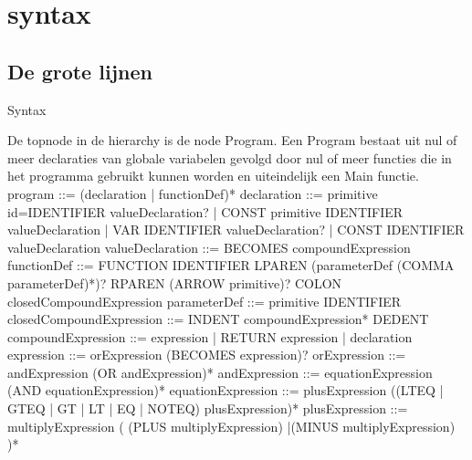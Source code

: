 \chapter{syntax}
\section{De grote lijnen}
Syntax

De topnode in de hierarchy is de node Program. Een Program bestaat uit nul of meer declaraties van globale variabelen gevolgd door nul of meer functies die in het programma gebruikt kunnen worden en uiteindelijk een Main functie.
\newline 
program                     ::= (declaration | functionDef)*
\newline 
declaration                 ::= primitive id=IDENTIFIER valueDeclaration?
                              | CONST primitive IDENTIFIER valueDeclaration
                              | VAR IDENTIFIER valueDeclaration?
                              | CONST IDENTIFIER valueDeclaration
\newline   
valueDeclaration            ::= BECOMES compoundExpression
\newline  
functionDef                 ::= FUNCTION IDENTIFIER LPAREN (parameterDef (COMMA parameterDef)*)? RPAREN (ARROW primitive)? COLON closedCompoundExpression
\newline   
parameterDef                ::= primitive IDENTIFIER 
\newline 
closedCompoundExpression    ::= INDENT compoundExpression* DEDENT
\newline 
compoundExpression          ::= expression
                              | RETURN expression
                              | declaration
\newline 
expression                  ::= orExpression (BECOMES expression)?
\newline   
orExpression                ::= andExpression (OR andExpression)*
\newline   
andExpression               ::= equationExpression (AND equationExpression)*
\newline 
equationExpression          ::= plusExpression ((LTEQ | GTEQ | GT | LT | EQ | NOTEQ) plusExpression)*
\newline 
plusExpression              ::= multiplyExpression (       (PLUS multiplyExpression)
                                                           |(MINUS multiplyExpression)
                                                   )*

